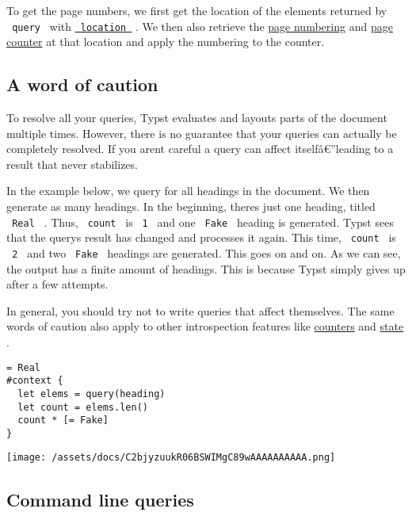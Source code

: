 To get the page numbers, we first get the location of the elements
returned by \texttt{\ query\ } with
\href{/docs/reference/foundations/content/\#definitions-location}{\texttt{\ location\ }}
. We then also retrieve the
\href{/docs/reference/introspection/location/\#definitions-page-numbering}{page
numbering} and
\href{/docs/reference/introspection/counter/\#page-counter}{page
counter} at that location and apply the numbering to the counter.

\subsection{A word of caution}\label{caution}

To resolve all your queries, Typst evaluates and layouts parts of the
document multiple times. However, there is no guarantee that your
queries can actually be completely resolved. If you
aren\textquotesingle t careful a query can affect itselfâ€''leading to a
result that never stabilizes.

In the example below, we query for all headings in the document. We then
generate as many headings. In the beginning, there\textquotesingle s
just one heading, titled \texttt{\ Real\ } . Thus, \texttt{\ count\ } is
\texttt{\ 1\ } and one \texttt{\ Fake\ } heading is generated. Typst
sees that the query\textquotesingle s result has changed and processes
it again. This time, \texttt{\ count\ } is \texttt{\ 2\ } and two
\texttt{\ Fake\ } headings are generated. This goes on and on. As we can
see, the output has a finite amount of headings. This is because Typst
simply gives up after a few attempts.

In general, you should try not to write queries that affect themselves.
The same words of caution also apply to other introspection features
like \href{/docs/reference/introspection/counter/}{counters} and
\href{/docs/reference/introspection/state/}{state} .

\begin{verbatim}
= Real
#context {
  let elems = query(heading)
  let count = elems.len()
  count * [= Fake]
}
\end{verbatim}

\texttt{[image: /assets/docs/C2bjyzuukR06BSWIMgC89wAAAAAAAAAA.png]}

\subsection{Command line queries}\label{command-line-queries}

